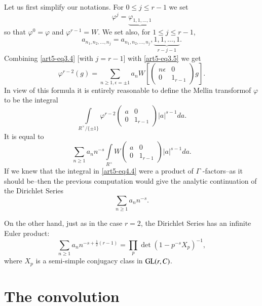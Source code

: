 Let us first simplify our notations. For $0\leq j\leq r-1$ we set
\begin{equation*}
\varphi^{j}=\underbrace{\varphi_{1,1,\ldots,1}}\tag{4.1}\label{art5-eq4.1}
\end{equation*}
so that $\varphi^{0}=\varphi$ and $\varphi^{r-1}=W$. We set also, for $1\leq j\leq r-1$,
$$
a_{n_{1},n_{2},\ldots,n_{j}}=a_{n_{1},n_{2},\ldots,n_{j}},\underbrace{1,1,\ldots,1}_{r-j-1}.
$$
Combining \eqref{art5-eq3.4} [with $j=r-1$] with \eqref{art5-eq3.5} we get
\begin{equation*}
\varphi^{r-2}(g)=\sum\limits_{n\geq 1, \epsilon=\pm 1}a_{n}W
\left[
\left(
\begin{matrix}
n\epsilon & 0\\
0 & 1_{r-1}
\end{matrix}
\right)g\right].\tag{4.2}\label{art5-eq4.2}
\end{equation*}
In view of this formula it is entirely reasonable to define the Mellin transform\pageoriginale of $\varphi$ to be the integral
\begin{equation*}
\int\limits_{R^{\times}/\{\pm 1\}}\varphi^{r-2}
\left(
\begin{matrix}
a & 0\\
0 & 1_{r-1}
\end{matrix}
\right)|a|^{s-1}da.\tag{4.3}\label{art5-eq4.3}
\end{equation*}
It is equal to
\begin{equation*}
\sum\limits_{n\geq 1}a_{n}n^{-s}\int\limits_{R^{\times}}W
\left(
\begin{matrix}
a & 0\\
0 & 1_{r-1}
\end{matrix}
\right)
|a|^{s-1}da.\tag{4.4}\label{art5-eq4.4}
\end{equation*}
If we knew that the integral in \eqref{art5-eq4.4} were a product of $\Gamma$ -factors--as it should be--then the previous computation would give the analytic continuation of the Dirichlet Series
\begin{equation*}
\sum\limits_{n\geq 1}a_{n}n^{-s}.\tag{4.5}\label{art5-eq4.5}
\end{equation*}

On the other hand, just as in the case $r=2$, the Dirichlet Series has an infinite Euler product:
$$
\sum\limits_{n\geq 1}a_{n}n^{-s+\frac{1}{2}(r-1)}=\prod\limits_{p}\det (1-p^{-s}X_{p})^{-1},
$$
where $X_{p}$ is a semi-simple conjugacy class in $\mathrm{GL}(r,C)$.

\section{The convolution}\label{art5-sec5}

